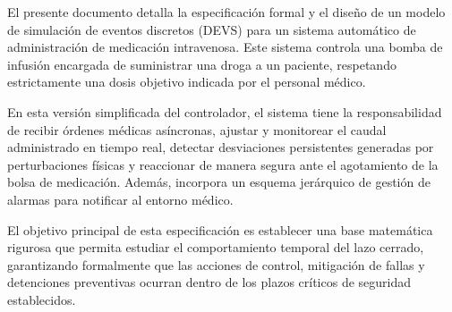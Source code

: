 El presente documento detalla la especificación formal y el diseño de un modelo de simulación de eventos discretos (DEVS) para un sistema automático de administración de medicación intravenosa. Este sistema controla una bomba de infusión encargada de suministrar una droga a un paciente, respetando estrictamente una dosis objetivo indicada por el personal médico.

En esta versión simplificada del controlador, el sistema tiene la responsabilidad de recibir órdenes médicas asíncronas, ajustar y monitorear el caudal administrado en tiempo real, detectar desviaciones persistentes generadas por perturbaciones físicas y reaccionar de manera segura ante el agotamiento de la bolsa de medicación. Además, incorpora un esquema jerárquico de gestión de alarmas para notificar al entorno médico.

El objetivo principal de esta especificación es establecer una base matemática rigurosa que permita estudiar el comportamiento temporal del lazo cerrado, garantizando formalmente que las acciones de control, mitigación de fallas y detenciones preventivas ocurran dentro de los plazos críticos de seguridad establecidos.
